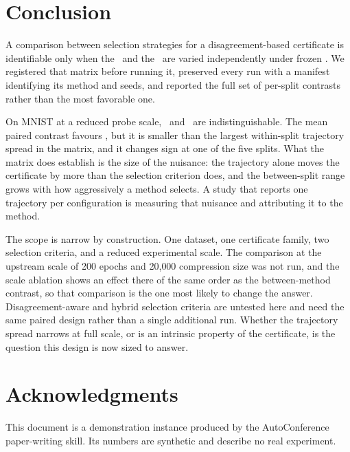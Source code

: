\section{Conclusion}
\label{sec:conclusion}

A comparison between selection strategies for a disagreement-based certificate
is identifiable only when the \splitseed\ and the \trajseed\ are varied
independently under frozen \evalsem. We registered that matrix before running
it, preserved every run with a manifest identifying its method and seeds, and
reported the full set of per-split contrasts rather than the most favorable one.

On MNIST at a reduced probe scale, \methodrandom\ and \methodmax\ are
indistinguishable. The mean paired contrast favours \methodrandom, but it is
smaller than the largest within-split trajectory spread in the matrix, and it
changes sign at one of the five splits. What the matrix does establish is the
size of the nuisance: the trajectory alone moves the certificate by more than
the selection criterion does, and the between-split range grows with how
aggressively a method selects. A study that reports one trajectory per
configuration is measuring that nuisance and attributing it to the method.

The scope is narrow by construction. One dataset, one certificate family, two
selection criteria, and a reduced experimental scale. The comparison at the
upstream scale of 200 epochs and 20{,}000 compression size was not run, and the
scale ablation shows an effect there of the same order as the between-method
contrast, so that comparison is the one most likely to change the answer.
Disagreement-aware and hybrid selection criteria are untested here and need the
same paired design rather than a single additional run. Whether the trajectory
spread narrows at full scale, or is an intrinsic property of the certificate, is
the question this design is now sized to answer.

\section*{Acknowledgments}
This document is a demonstration instance produced by the AutoConference
paper-writing skill. Its numbers are synthetic and describe no real experiment.
